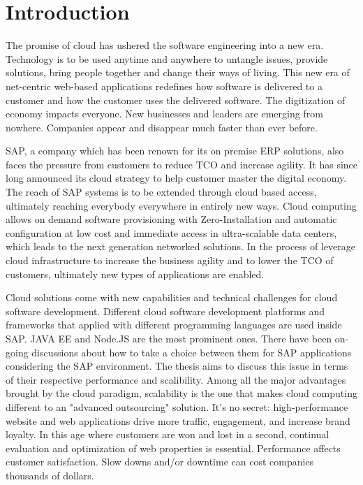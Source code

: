 \chapter{Introduction}
The promise of cloud has ushered the software engineering into a new era. Technology is to be used anytime and anywhere to untangle issues, provide solutions, bring people together and change their ways of living. This new era of net-centric web-based applications redefines how software is delivered to a customer and how the customer uses the delivered software. The digitization of economy impacts everyone. New businesses and leaders are emerging from nowhere. Companies appear and disappear much faster than ever before. 

SAP, a company which has been renown for its on premise ERP solutions, also faces the pressure from customers to reduce \ac{TCO} and increase agility. It has since long announced its cloud strategy to help customer master the digital economy. The reach of SAP systems is to be extended through cloud based access, ultimately reaching everybody everywhere in entirely new ways. Cloud computing allows on demand software provisioning with Zero-Installation and automatic configuration at low cost and immediate access in ultra-scalable data centers, which leads to the next generation networked solutions. In the process of leverage cloud infrastructure to increase the business agility and to lower the TCO of customers, ultimately new types of applications are enabled.

Cloud solutions come with new capabilities and technical challenges for cloud software development. Different cloud software development platforms and frameworks that applied with different programming languages are used inside SAP. JAVA EE and Node.JS are the most prominent ones. There have been on-going discussions about how to  take a choice between them for SAP applications considering the SAP environment. The thesis aims to discuss this issue in terms of their respective performance and scalibility. Among all the major advantages brought by the cloud paradigm, scalability is the one that makes cloud computing different to an "advanced outsourcing" solution. It’s no secret: high-performance website and web applications drive more traffic, engagement, and increase brand loyalty. In this age where customers are won and lost in a second, continual evaluation and optimization of web properties is essential.  Performance affects customer satisfaction. Slow downs and/or downtime can cost companies thousands of dollars.\\





